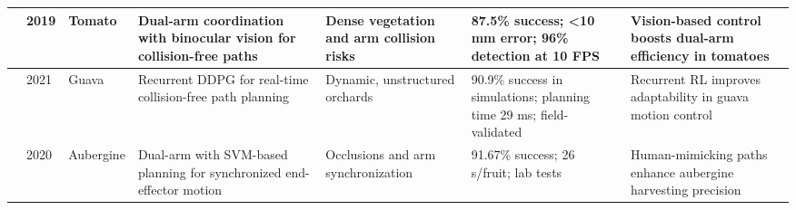 \documentclass[pdflatex,sn-mathphys-num]{sn-jnl}
\begin{document}
\begin{table}[htbp]
\begin{tabular}{p{1.2cm}p{0.8cm}p{1.5cm}p{3cm}p{2.5cm}p{3cm}p{3.5cm}}
\cite{ling2019dual} & 2019 & Tomato & Dual-arm coordination with binocular vision for collision-free paths & Dense vegetation and arm collision risks & 87.5\% success; <10 mm error; 96\% detection at 10 FPS & Vision-based control boosts dual-arm efficiency in tomatoes \\ \midrule
\cite{lin2021collision} & 2021 & Guava & Recurrent DDPG for real-time collision-free path planning & Dynamic, unstructured orchards & 90.9\% success in simulations; planning time 29 ms; field-validated & Recurrent RL improves adaptability in guava motion control \\ \midrule
\cite{sepulveda2020robotic} & 2020 & Aubergine & Dual-arm with SVM-based planning for synchronized end-effector motion & Occlusions and arm synchronization & 91.67\% success; 26 s/fruit; lab tests & Human-mimicking paths enhance aubergine harvesting precision \\ \midrule


\end{tabular}
\end{table}
\end{document}
